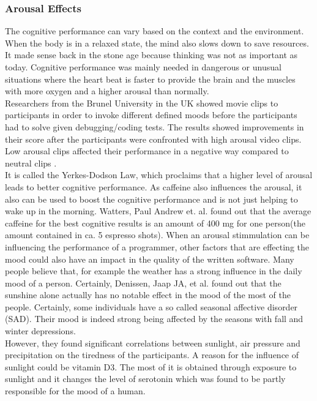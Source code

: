 \subsubsection{Arousal Effects}
The cognitive performance can vary based on the context and the environment. When the body is in a relaxed state, the mind also slows down to save resources. It made sense back in the stone age because thinking was not as important as today. Cognitive performance was mainly needed in dangerous or unusual situations where the heart beat is faster to provide the brain and the muscles with more oxygen and a higher arousal than normally.\\
Researchers from the Brunel University in the UK showed movie clips to participants in order to invoke different defined moods before the participants had to solve given debugging/coding tests. The results showed improvements in their score after the participants were confronted with high arousal video clips. Low arousal clips affected their performance in a negative way compared to neutral clips \cite{khan2007mood}.\\ 
It is called the Yerkes-Dodson Law, which proclaims that a higher level of arousal leads to better cognitive performance. As caffeine also influences the arousal, it also can be used to boost the cognitive performance and is not just helping to wake up in the morning. Watters, Paul Andrew et. al. \cite{watters1997caffeine} found out that the average caffeine for the best cognitive results is an amount of 400 mg for one person(the amount contained in ca. 5 espresso shots).
\bigbreak
When an arousal stimmulation can be influencing the performance of a programmer, other factors that are effecting the mood could also have an impact in the quality of the written software. Many people believe that, for example the weather has a strong influence in the daily mood of a person. Certainly, Denissen, Jaap JA, et al. \cite{denissen2008effects} found out that the sunshine alone actually has no notable effect in the mood of the most of the people. Certainly, some individuals have a so called seasonal affective disorder (SAD). Their mood is indeed strong being affected by the seasons with fall and winter depressions.\\ 
However, they found significant correlations between sunlight, air pressure and precipitation on the tiredness of the participants.
A reason for the influence of sunlight could be vitamin D3. The most of it is obtained through exposure to sunlight and it changes the level of serotonin which was found to be partly responsible for the mood of a human.

